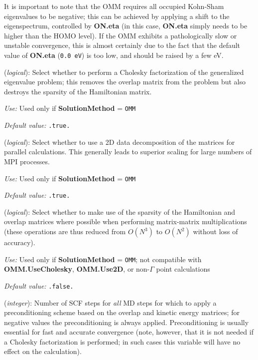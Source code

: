 It is important to note that the OMM requires all occupied Kohn-Sham
eigenvalues to be negative; this can be achieved by applying a shift
to the eigenspectrum, controlled by \textbf{ON.eta} (in this case,
\textbf{ON.eta} simply needs to be higher than the HOMO level). If the OMM
exhibits a pathologically slow or unstable convergence, this is almost
certainly due to the fact that the default value of \textbf{ON.eta}
(\texttt{0.0 eV}) is too low, and should be raised by a few eV.

\begin{description}
\itemsep 10pt
\parsep 0pt

\item[\textbf{OMM.UseCholesky}] (\textit{logical}):
Select whether to perform a Cholesky factorization of the generalized eigenvalue
problem; this removes the overlap matrix from the problem but also destroys the
sparsity of the Hamiltonian matrix.

\textit{Use:} Used only if \textbf{SolutionMethod} = \texttt{OMM}

\textit{Default value:} \texttt{.true.}

\item[\textbf{OMM.Use2D}] (\textit{logical}):
Select whether to use a 2D data decomposition of the matrices for parallel
calculations. This generally leads to superior scaling for large numbers of MPI
processes.

\textit{Use:} Used only if \textbf{SolutionMethod} = \texttt{OMM}

\textit{Default value:} \texttt{.true.}

\item[\textbf{OMM.UseSparse}] (\textit{logical}):
Select whether to make use of the sparsity of the Hamiltonian and overlap
matrices where possible when performing matrix-matrix multiplications (these
operations are thus reduced from $O(N^3)$ to $O(N^2)$ without loss of
accuracy).

\textit{Use:} Used only if \textbf{SolutionMethod} = \texttt{OMM}; not compatible with
\textbf{OMM.UseCholesky}, \textbf{OMM.Use2D}, or non-$\Gamma$ point calculations

\textit{Default value:} \texttt{.false.}

\item[\textbf{OMM.Precon}] (\textit{integer}):
Number of SCF steps for {\em all} MD steps for which to apply a preconditioning
scheme based on the overlap and kinetic energy matrices; for negative values the
preconditioning is always applied. Preconditioning is usually essential for fast
and accurate convergence (note, however, that it is not needed if a Cholesky
factorization is performed; in such cases this variable will have no effect on
the calculation).


\end{description}
